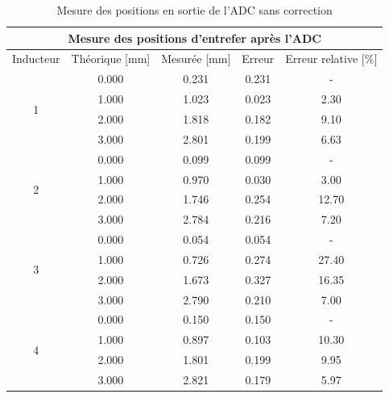 \begin{table}[H]
    \centering
    \begin{tabular}{|c|c|c|c|c|}
        \hline
        \multicolumn{5}{|c|}{\textbf{Mesure des positions d'entrefer après l'ADC}}                     \\ \hline
        Inducteur          & Théorique {[}mm{]} & Mesurée {[}mm{]} & Erreur & Erreur relative {[}\%{]} \\ \hline
        \multirow{4}{*}{1} & 0.000              & 0.231            & 0.231  & -                        \\ \cline{2-5}
                           & 1.000              & 1.023            & 0.023  & 2.30                     \\ \cline{2-5}
                           & 2.000              & 1.818            & 0.182  & 9.10                     \\ \cline{2-5}
                           & 3.000              & 2.801            & 0.199  & 6.63                     \\ \hline
        \multirow{4}{*}{2} & 0.000              & 0.099            & 0.099  & -                        \\ \cline{2-5}
                           & 1.000              & 0.970            & 0.030  & 3.00                     \\ \cline{2-5}
                           & 2.000              & 1.746            & 0.254  & 12.70                    \\ \cline{2-5}
                           & 3.000              & 2.784            & 0.216  & 7.20                     \\ \hline
        \multirow{4}{*}{3} & 0.000              & 0.054            & 0.054  & -                        \\ \cline{2-5}
                           & 1.000              & 0.726            & 0.274  & 27.40                    \\ \cline{2-5}
                           & 2.000              & 1.673            & 0.327  & 16.35                    \\ \cline{2-5}
                           & 3.000              & 2.790            & 0.210  & 7.00                     \\ \hline
        \multirow{4}{*}{4} & 0.000              & 0.150            & 0.150  & -                        \\ \cline{2-5}
                           & 1.000              & 0.897            & 0.103  & 10.30                    \\ \cline{2-5}
                           & 2.000              & 1.801            & 0.199  & 9.95                     \\ \cline{2-5}
                           & 3.000              & 2.821            & 0.179  & 5.97                     \\ \hline
    \end{tabular}
    \caption{Mesure des positions en sortie de l'ADC sans correction}
    \label{tab:premier_etalonnage_code_adc}
\end{table}

